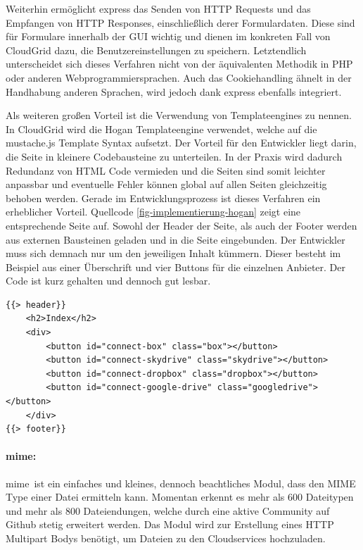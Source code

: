 Weiterhin ermöglicht express das Senden von \ac{HTTP} Requests und das Empfangen von \ac{HTTP} Responses, einschließlich derer Formulardaten.
Diese sind für Formulare innerhalb der \ac{GUI} wichtig und dienen im konkreten Fall von CloudGrid dazu, die Benutzereinstellungen zu speichern.
Letztendlich unterscheidet sich dieses Verfahren nicht von der äquivalenten Methodik in PHP oder anderen Webprogrammiersprachen.
Auch das Cookiehandling ähnelt in der Handhabung anderen Sprachen, wird jedoch dank express ebenfalls integriert.

Als weiteren großen Vorteil ist die Verwendung von Templateengines zu nennen.
In CloudGrid wird die Hogan Templateengine verwendet, welche auf die mustache.js Template Syntax aufsetzt.
Der Vorteil für den Entwickler liegt darin, die Seite in kleinere Codebausteine zu unterteilen.
In der Praxis wird dadurch Redundanz von \ac{HTML} Code vermieden und die Seiten sind somit leichter anpassbar und eventuelle Fehler können global auf allen Seiten gleichzeitig behoben werden.
Gerade im Entwicklungsprozess ist dieses Verfahren ein erheblicher Vorteil.
Quellcode \ref{fig-implementierung-hogan} zeigt eine entsprechende Seite auf.
Sowohl der Header der Seite, als auch der Footer werden aus externen Bausteinen geladen und in die Seite eingebunden.
Der Entwickler muss sich demnach nur um den jeweiligen Inhalt kümmern.
Dieser besteht im Beispiel aus einer Überschrift und vier Buttons für die einzelnen Anbieter.
Der Code ist kurz gehalten und dennoch gut lesbar.
\newpage
\lstset{
    language=HTML
}
\begin{lstlisting}[label=fig-implementierung-hogan,caption=Aufbau einer mit Hogan erstellten HTML Seite]
{{> header}}
    <h2>Index</h2>
    <div>
        <button id="connect-box" class="box"></button>
        <button id="connect-skydrive" class="skydrive"></button>
        <button id="connect-dropbox" class="dropbox"></button>
        <button id="connect-google-drive" class="googledrive"></button>
    </div>
{{> footer}}
\end{lstlisting}
\lstset{
    language=JavaScript
}

\paragraph{mime:}\frqq mime\flqq\ ist ein einfaches und kleines, dennoch beachtliches Modul, dass den \ac{MIME} Type einer Datei ermitteln kann.
Momentan erkennt es mehr als 600 Dateitypen und mehr als 800 Dateiendungen, welche durch eine aktive Community auf Github stetig erweitert werden.
Das Modul wird zur Erstellung eines \ac{HTTP} Multipart Bodys benötigt, um Dateien zu den Cloudservices hochzuladen.

